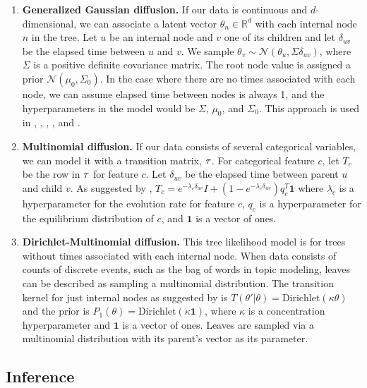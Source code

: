 \begin{enumerate}
    \item \textbf{Generalized Gaussian diffusion.} If our data
    is continuous and $d$-dimensional, we can associate
    a latent vector $\theta_n \in \mathbb{R}^d$ with each internal node
    $n$ in the tree. Let $u$ be an internal node
    and $v$ one of its children and
    let $\delta_{uv}$ be the elapsed time between $u$ and $v$.
    We sample $\theta_v \sim \mathcal{N}(\theta_u, \Sigma\delta_{uv})$,
    where $\Sigma$ is a positive definite covariance matrix.
    The root node value is assigned a prior
    $\mathcal{N}(\mu_0, \Sigma_0)$.
    In the case where there are no times associated with each node,
    we can assume elapsed time between nodes is always 1,
    and the hyperparameters in the model would be
    $\Sigma$, $\mu_0$, and $\Sigma_0$.
    This approach is used in \citet{Neal2003}, \citet{Teh2009}, \citet{Knowles2015},
    \citet{Adams2010}, \citet{Boyles2012} and \citet{Hu2013}.
    \item \textbf{Multinomial diffusion.} If our data
    consists of several categorical variables, 
    we can model it with a transition matrix, $\tau$.
    For categorical feature $c$, let $T_c$ 
    be the row in $\tau$ for feature $c$.
    Let $\delta_{uv}$ be the elapsed time between parent $u$ and child $v$.
    As suggested by
    \citet{Teh2009},
    $T_{c} = e^{-\lambda_{c}\delta_{uv}}I + (1 -  e^{-\lambda_{c}\delta_{uv}})q_{c}^T\bm{1}$
    where $\lambda_{c}$ is a hyperparameter for the evolution rate for feature 
    $c$, $q_{c}$ is a hyperparameter for the equilibrium
    distribution of $c$, and $\bm{1}$ is a vector of ones.
    \item \textbf{Dirichlet-Multinomial diffusion.}
    This tree likelihood model is for
    trees without times associated with each internal node.
    When data consists of counts of discrete events,
    such as the bag of words in topic modeling,
    leaves can be described as sampling
    a multinomial distribution.
    The transition kernel for
    just internal nodes as suggested by \citet{Adams2010} is $T(\theta' | \theta) = \text{Dirichlet}(\kappa\theta)$
    and the prior is $P_1(\theta) = \text{Dirichlet}(\kappa\bm{1})$,
    where $\kappa$ is a concentration hyperparameter and $\bm{1}$ is a
    vector of ones.
    Leaves are sampled via a multinomial distribution
    with its parent's vector as its parameter.
\end{enumerate}

\subsection{Inference}

